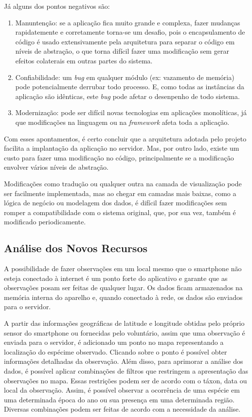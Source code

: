 Já alguns dos pontos negativos são:

\begin{enumerate}
  \item Manuntenção: se a aplicação fica muito grande e complexa, fazer mudanças rapidatemente e corretamente torna-se um desafio, pois o encapsulamento de código é usado extensivamente pela arquitetura para separar o código em níveis de abstração, o que torna difícil fazer uma modificação sem gerar efeitos colaterais em outras partes do sistema.
  \item Confiabilidade: um \emph{bug} em qualquer módulo (ex: vazamento de memória) pode potencialmente derrubar todo processo. E, como todas as instâncias da aplicação são idênticas, este \emph{bug} pode afetar o desenpenho de todo sistema.
  \item Modernização: pode ser difícil novas tecnologias em aplicações monolíticas, já que modificações na linguagem ou na \emph{framework} afeta toda a aplicação.
\end{enumerate}

Com esses apontamentos, é certo concluir que a arquitetura adotada pelo projeto facilita a implantação da aplicação no servidor. Mas, por outro lado, existe um custo para fazer uma modificação no código, principalmente se a modificação envolver vários níveis de abstração.

Modificações como tradução ou qualquer outra na camada de visualização pode ser facilmente implementada, mas ao chegar em camadas mais baixas, como a lógica de negócio ou modelagem dos dados, é difícil fazer modificações sem romper a compatibilidade com o sistema original, que, por sua vez, também é modificado periodicamente.

\subsection{Análise dos Novos Recursos}

A possibilidade de fazer observações em um local mesmo que o smartphone não esteja conectado à internet é um ponto forte do aplicativo e garante que as observações posam ser feitas de qualquer lugar. Os dados ficam armazenados na memória interna do aparelho e, quando conectado à rede, os dados são enviados para o servidor.

A partir das informações geográficas de latitude e longitude obtidas pelo próprio sensor do smartphone ou fornecidas pelo voluntário, assim que uma observação é enviada para o servidor, é adicionado um ponto no mapa representando a localização do espécime observado. Clicando sobre o ponto é possível obter informações detalhadas da observação. Além disso, para aprimorar a análise dos dados, é possível aplicar combinações de filtros que restringem a apresentação das observações no mapa. Essas restrições podem ser de acordo com o táxon, data ou local da observação. Assim, é possível observar a ocorrência de uma espécie em uma determinada época do ano ou sua presença em uma determinada região. Diversas combinações podem ser feitas de acordo com a necessidade da análise.

